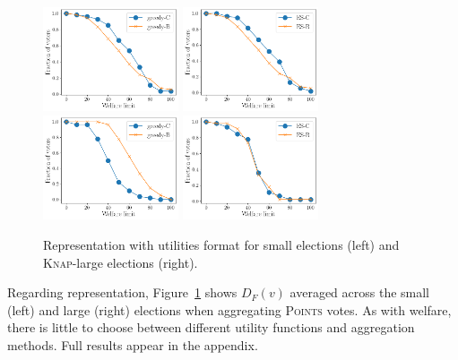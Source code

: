 \documentclass[mnsc,blindrev]{informs3_freeuse} %
\newcommand{\kibitz}[2]{\ifnum\Comments=1{\color{#1}{#2}}\fi}
\newcommand{\gb}[1]{\kibitz{red}{[GB:#1]}}
\newcommand{\points}{\textsc{Points}}
\newcommand{\knap}{\textsc{Knap}}
\begin{document}
\begin{figure}[!t]
\begin{center}
\includegraphics[width=4cm]{experiment/('Utilities', 6, 'Utilities')_greedy.png}
\includegraphics[width=4cm]{experiment/('Utilities', 6, 'Utilities')_ES.png}
\includegraphics[width=4cm]{experiment/('Utilities', 7, 'Utilities')_greedy.png}
\includegraphics[width=4cm]{experiment/('Utilities', 8, 'Utilities')_ES.png}

\caption{Representation with utilities format for  small elections (left) and \knap-large elections (right). 
}\label{fig:exp:representation}
\end{center}\vspace{-5mm}
\end{figure}

Regarding representation, Figure~\ref{fig:exp:representation} shows $D_F(v)$ averaged across the  small   (left) and large (right) elections when aggregating \points{} votes. As with welfare, there is little to choose between different utility functions and aggregation methods. Full results appear in the appendix. \gb{note-appendix} 
\end{document}
